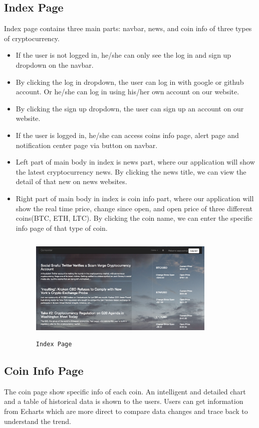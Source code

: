 \subsection{Index Page}
Index page contains three main parts: navbar, news, and coin info of three types 
of cryptocurrency.
\begin{itemize}
\item If the user is not logged in, he/she can only see the log in and sign up
dropdown on the navbar. 
\item By clicking the log in dropdown, the user can log in with google or github
account. Or he/she can log in using his/her own account on our website.
\item By clicking the sign up dropdown, the user can sign up an account on our 
website.
\item If the user is logged in, he/she can access coins info page, alert page
and notification center page via button on navbar.
\item Left part of main body in index is news part, where our application will
show the latest cryptocurrency news. By clicking the news title, we can view the
detail of that new on news websites.
\item Right part of main body in index is coin info part, where our application 
will show the real time price, change since open, and open price of three different 
coins(BTC, ETH, LTC). By clicking the coin name, we can enter the specific info 
page of that type of coin.
\begin{figure}[!htb]
\includegraphics[height=2.0in, width=3.5in]{index.jpg}
\caption{\texttt{Index Page}}
\end{figure}
\end{itemize}

\subsection{Coin Info Page}
The coin page show specific info of each coin. An intelligent and detailed chart 
and a table of historical data is shown to the users. Users can get information 
from Echarts which are more direct to compare data changes and trace back to understand the trend.

